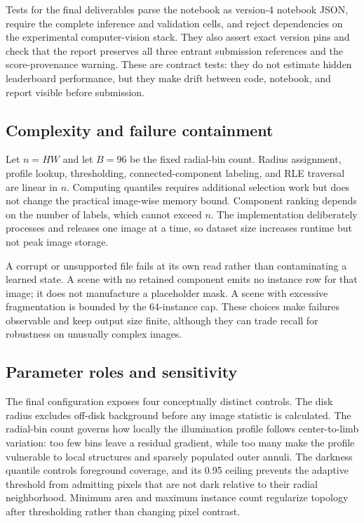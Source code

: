 \documentclass[sigconf]{acmart}
\begin{document}
Tests for the final deliverables parse the notebook as version-4 notebook JSON,
require the complete inference and validation cells, and reject dependencies on
the experimental computer-vision stack. They also assert exact version pins and
check that the report preserves all three entrant submission references and the
score-provenance warning. These are contract tests: they do not estimate hidden
leaderboard performance, but they make drift between code, notebook, and report
visible before submission.

\subsection{Complexity and failure containment}
Let $n=HW$ and let $B=96$ be the fixed radial-bin count. Radius assignment,
profile lookup, thresholding, connected-component labeling, and RLE traversal
are linear in $n$. Computing quantiles requires additional selection work but
does not change the practical image-wise memory bound. Component ranking depends
on the number of labels, which cannot exceed $n$. The implementation deliberately
processes and releases one image at a time, so dataset size increases runtime but
not peak image storage.

A corrupt or unsupported file fails at its own read rather than contaminating a
learned state. A scene with no retained component emits no instance row for that
image; it does not manufacture a placeholder mask. A scene with excessive
fragmentation is bounded by the 64-instance cap. These choices make failures
observable and keep output size finite, although they can trade recall for
robustness on unusually complex images.

\subsection{Parameter roles and sensitivity}
The final configuration exposes four conceptually distinct controls. The disk
radius excludes off-disk background before any image statistic is calculated.
The radial-bin count governs how locally the illumination profile follows
center-to-limb variation: too few bins leave a residual gradient, while too many
make the profile vulnerable to local structures and sparsely populated outer
annuli. The darkness quantile controls foreground coverage, and its 0.95 ceiling
prevents the adaptive threshold from admitting pixels that are not dark relative
to their radial neighborhood. Minimum area and maximum instance count regularize
topology after thresholding rather than changing pixel contrast.
\end{document}
